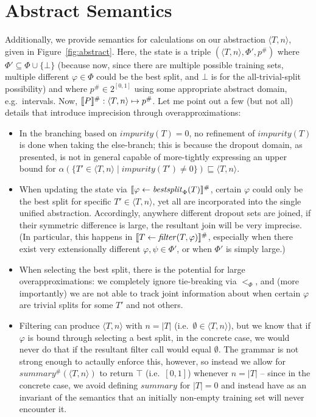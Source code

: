 \section{Abstract Semantics}

Additionally, we provide semantics for calculations on our abstraction $\langle T, n \rangle$,
given in Figure~\ref{fig:abstract}.
Here, the state is a triple $(\langle T, n \rangle, \Phi', p^\#)$
where $\Phi' \subseteq \Phi \cup \{\bot\}$
(because now, since there are multiple possible training sets,
multiple different $\varphi \in \Phi$ could be the best split,
and $\bot$ is for the all-trivial-split possibility)
and where $p^\# \in 2^{[0,1]}$
using some appropriate abstract domain, e.g.\ intervals.
Now, $\den{P}^\# : \langle T, n \rangle \mapsto p^\#$.
Let me point out a few (but not all) details
that introduce imprecision through overapproximations:
\begin{itemize}
    \item In the branching based on $\mathit{impurity}(T) = 0$,
        no refinement of $\mathit{impurity}(T)$ is done when taking the else-branch;
        this is because the dropout domain, as presented,
        is not in general capable of more-tightly expressing an upper bound for
        $\alpha(\{T' \in \langle T, n \rangle \mid \mathit{impurity}(T') \neq 0\})
        \sqsubseteq \langle T, n \rangle$.
    \item When updating the state via
        $\den{\varphi \gets \mathit{bestsplit}_\Phi(T)}^\#$,
        certain $\varphi$ could only be the best split for specific $T' \in \langle T, n \rangle$,
        yet all are incorporated into the single unified abstraction.
        Accordingly, anywhere different dropout sets are joined,
        if their symmetric difference is large, the resultant join
        will be very imprecise.
        (In particular, this happens in $\den{T \gets \mathit{filter}(T, \varphi)}^\#$,
        especially when there exist very extensionally different $\varphi, \psi \in \Phi'$,
        or when $\Phi'$ is simply large.)
    \item When selecting the best split, there is the potential for large overapproximations:
        \rone we completely ignore tie-breaking via $<_\Phi$, and (more importantly)
        \rtwo we are not able to track joint information about when certain $\varphi$
        are trivial splits for some $T'$ and not others.
    \item Filtering can produce $\langle T, n \rangle$ with $n = |T|$ (i.e.\ $\emptyset \in \langle T, n \rangle$),
        but we know that if $\varphi$ is bound through selecting a best split,
        in the concrete case, we would never do that if the resultant filter call would equal $\emptyset$.
        The grammar is not strong enough to actaully enforce this, however,
        so instead we allow for $\mathit{summary^\#}(\langle T, n \rangle)$
        to return $\top$ (i.e.\ $[0, 1]$) whenever $n = |T|$ --
        since in the concrete case, we avoid defining $\mathit{summary}$ for $|T| = 0$
        and instead have as an invariant of the semantics that an initially non-empty training set
        will never encounter it.
\end{itemize}


